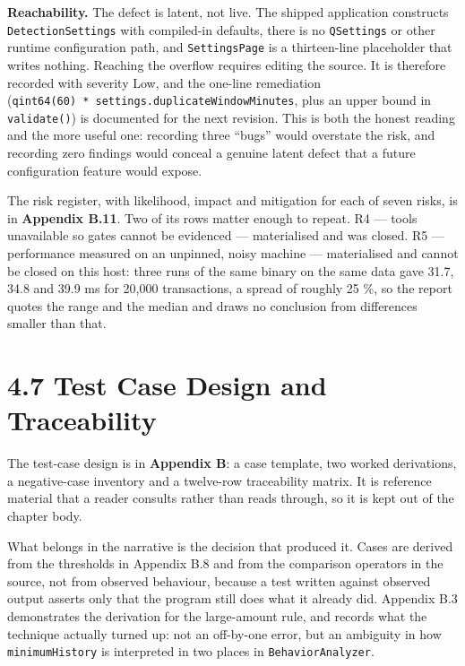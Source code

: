 \documentclass[
  12pt,
]{report}
\begin{document}
\textbf{Reachability.} The defect is latent, not live. The shipped
application constructs \texttt{Detection\-Settings} with compiled-in
defaults, there is no \texttt{QSettings} or other runtime configuration
path, and \texttt{SettingsPage} is a thirteen-line placeholder that
writes nothing. Reaching the overflow requires editing the source. It is
therefore recorded with severity Low, and the one-line remediation
(\texttt{qint64(60)\ *\ settings.duplicate\-Window\-Minutes}, plus an upper
bound in \texttt{validate()}) is documented for the next revision. This
is both the honest reading and the more useful one: recording three
``bugs'' would overstate the risk, and recording zero findings would
conceal a genuine latent defect that a future configuration feature
would expose.

The risk register, with likelihood, impact and mitigation for each of
seven risks, is in \textbf{Appendix B.11}. Two of its rows matter enough
to repeat. R4 --- tools unavailable so gates cannot be evidenced ---
materialised and was closed. R5 --- performance measured on an unpinned,
noisy machine --- materialised and cannot be closed on this host: three
runs of the same binary on the same data gave 31.7, 34.8 and 39.9 ms for
20,000 transactions, a spread of roughly 25 \%, so the report quotes the
range and the median and draws no conclusion from differences smaller
than that.

\section{4.7 Test Case Design and
Traceability}\label{test-case-design-and-traceability}

The test-case design is in \textbf{Appendix B}: a case template, two
worked derivations, a negative-case inventory and a twelve-row
traceability matrix. It is reference material that a reader consults
rather than reads through, so it is kept out of the chapter body.

What belongs in the narrative is the decision that produced it. Cases
are derived from the thresholds in Appendix B.8 and from the comparison
operators in the source, not from observed behaviour, because a test
written against observed output asserts only that the program still does
what it already did. Appendix B.3 demonstrates the derivation for the
large-amount rule, and records what the technique actually turned up:
not an off-by-one error, but an ambiguity in how \texttt{minimumHistory}
is interpreted in two places in \texttt{Behavior\-Analyzer}.
\end{document}

